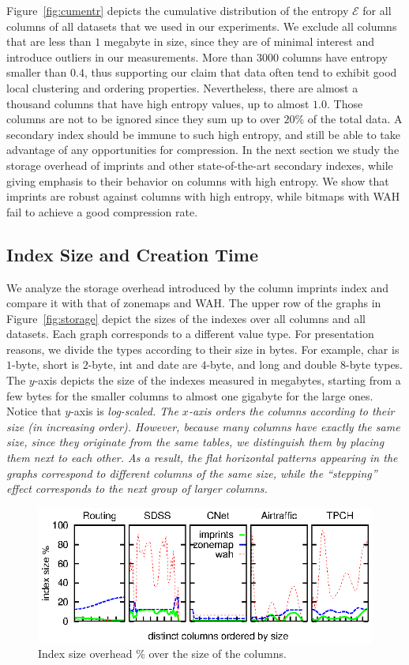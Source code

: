 Figure~\ref{fig:cumentr} depicts the cumulative distribution of the entropy
$\mathcal{E}$ for all columns of all datasets that we used in our experiments.
We exclude all columns that are less than $1$ megabyte in size, since
they are of minimal interest and introduce outliers in our measurements. More
than $3000$ columns have entropy smaller than $0.4$, thus supporting our claim
that data often tend to exhibit good local clustering and ordering properties.
Nevertheless, there are almost a thousand columns that have high entropy
values, up to almost $1.0$. Those columns are not to be ignored since they sum
up to over $20$\% of the total data. A secondary index should be immune to such
high entropy, and still be able to take advantage of any opportunities for
compression. In the next section we study the storage overhead of imprints and
other state-of-the-art secondary indexes, while giving emphasis to their
behavior on columns with high entropy. We show that imprints are robust
against columns with high entropy, while bitmaps with WAH fail to achieve a
good compression rate.

\subsection{Index Size and Creation Time}

We analyze the storage overhead introduced by the column imprints index
and compare it with that of zonemaps and WAH. The upper row of the graphs in
Figure~\ref{fig:storage} depict the sizes of the indexes over all columns and
all datasets. Each graph corresponds to a different value type. For
presentation reasons, we divide the types according to their size in bytes. For
example, char is $1$-byte, short is $2$-byte, int and date are
$4$-byte, and long and double $8$-byte types. The $y$-axis depicts the size of
the indexes measured in megabytes, starting from a few bytes for the smaller
columns to almost one gigabyte for the large ones. Notice that $y$-axis is
\it{log-scaled}. The $x$-axis orders the columns according to their size (in
increasing order). However, because many columns have exactly the same size,
since they originate from the same tables, we distinguish them by placing them
next to each other. As a result, the flat horizontal patterns appearing in the
graphs correspond to different columns of the same size, while the
``stepping'' effect corresponds to the next group of larger columns.

\begin{figure}
\includegraphics{figs/static/percentage}
\caption{Index size overhead \% over the size of the columns.}
\label{fig:perc}
\end{figure}

